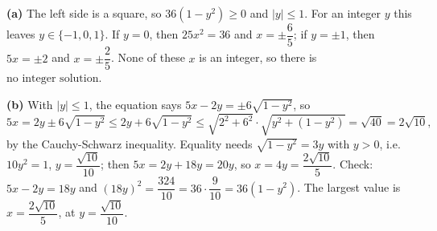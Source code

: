 \textbf{(a)} The left side is a square, so $36(1-y^2)\ge0$ and $|y|\le1$. For an integer $y$ this leaves $y\in\{-1,0,1\}$. If $y=0$, then $25x^2=36$ and $x=\pm\dfrac{6}{5}$; if $y=\pm1$, then $5x=\pm2$ and $x=\pm\dfrac{2}{5}$. None of these $x$ is an integer, so there is $\boxed{\text{no integer solution}}$.

\textbf{(b)} With $|y|\le1$, the equation says $5x-2y=\pm6\sqrt{1-y^2}$, so
\[
5x=2y\pm6\sqrt{1-y^2}\le2y+6\sqrt{1-y^2}\le\sqrt{2^2+6^2}\cdot\sqrt{y^2+\left(1-y^2\right)}=\sqrt{40}=2\sqrt{10},
\]
by the Cauchy-Schwarz inequality. Equality needs $\sqrt{1-y^2}=3y$ with $y>0$, i.e.\ $10y^2=1$, $y=\dfrac{\sqrt{10}}{10}$; then $5x=2y+18y=20y$, so $x=4y=\dfrac{2\sqrt{10}}{5}$. Check: $5x-2y=18y$ and $(18y)^2=\dfrac{324}{10}=36\cdot\dfrac{9}{10}=36(1-y^2)$. The largest value is $x=\boxed{\dfrac{2\sqrt{10}}{5}}$, at $y=\dfrac{\sqrt{10}}{10}$.
